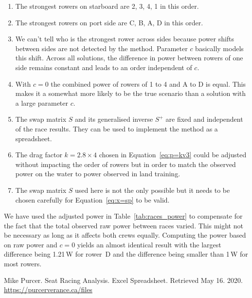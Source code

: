 \documentclass[a4paper,11pt]{article}
\begin{document}
\begin{enumerate}
\item The strongest rowers on starboard are 2, 3, 4, 1 in this order.
\item The strongest rowers on port side are C, B, A, D in this order.
\item We can't tell who is the strongest rower across sides because power
      shifts between sides are not detected by the method. Parameter $c$
      basically models this shift. Across all solutions, the difference
      in power between rowers of one side remains constant and leads to
      an order independent of $c$.
\item With $c=0$ the combined power of rowers of 1 to 4 and A to D is
      equal. This makes it a somewhat more likely to be the true
      scenario than a solution with a large parameter $c$.
\item The swap matrix $S$ and its generalised inverse $S^+$ are fixed
      and independent of the race results. They can be used to implement
      the method as a spreadsheet.
\item The drag factor $k = 2.8 \times 4$ chosen in
      Equation~\ref{eq:p=kv3} could be adjusted without impacting the
      order of rowers but in order to match the observed power on the
      water to power observed in land training.
\item The swap matrix $S$ used here is not the only possible but it
      needs to be chosen carefully for Equation~\ref{eq:x=sp} to be
      valid.
\end{enumerate}

We have used the adjusted power in Table~\ref{tab:races_power} to
compensate for the fact that the total observed raw power between races
varied. This might not be necessary as long as it affects both crews
equally. Computing the power based on raw power and $c=0$ yields an
almost identical result with the largest difference being 1.21\,W for
rower~D and the difference being smaller than 1\,W for most rowers.

\begin{thebibliography}{10}
 Mike Purcer.  Seat
Racing Analysis. Excel Spreadsheet. Retrieved May 16.  2020.
\url{https://purcerverance.ca/files}
\end{thebibliography}
\end{document}
